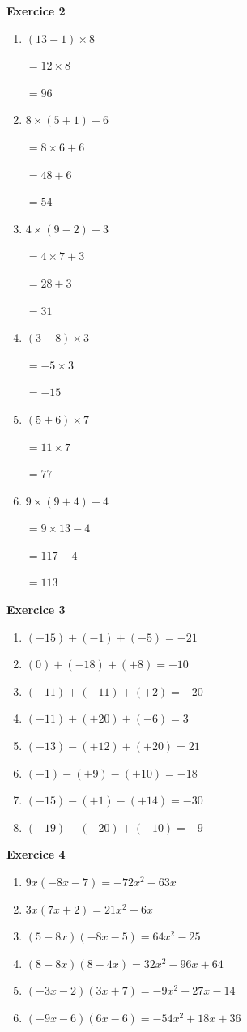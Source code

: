 \documentclass[12pt,a4paper,french]{article}
\begin{document}
\noindent\textbf{Exercice 2}\par
\smallskip
\begin{enumerate}
\item $(13 - 1) \times 8$

$= 12 \times 8$

$= 96$
\item $8 \times (5 + 1) + 6$

$= 8 \times 6 + 6$

$= 48 + 6$

$= 54$
\item $4 \times (9 - 2) + 3$

$= 4 \times 7 + 3$

$= 28 + 3$

$= 31$
\item $(3 - 8) \times 3$

$= -5 \times 3$

$= -15$
\item $(5 + 6) \times 7$

$= 11 \times 7$

$= 77$
\item $9 \times (9 + 4) - 4$

$= 9 \times 13 - 4$

$= 117 - 4$

$= 113$
\end{enumerate}
\medskip

\noindent\textbf{Exercice 3}\par
\smallskip
\begin{enumerate}
\item $(-15) + (-1) + (-5) = -21$
\item $(0) + (-18) + (+8) = -10$
\item $(-11) + (-11) + (+2) = -20$
\item $(-11) + (+20) + (-6) = 3$
\item $(+13) - (+12) + (+20) = 21$
\item $(+1) - (+9) - (+10) = -18$
\item $(-15) - (+1) - (+14) = -30$
\item $(-19) - (-20) + (-10) = -9$
\end{enumerate}
\medskip

\noindent\textbf{Exercice 4}\par
\smallskip
\begin{enumerate}
\item $9x(-8x - 7) = -72x^2 - 63x$
\item $3x(7x + 2) = 21x^2 + 6x$
\item $(5 - 8x)(-8x - 5) = 64x^2 - 25$
\item $(8 - 8x)(8 - 4x) = 32x^2 - 96x + 64$
\item $(-3x - 2)(3x + 7) = -9x^2 - 27x - 14$
\item $(-9x - 6)(6x - 6) = -54x^2 + 18x + 36$
\end{enumerate}
\medskip
\end{document}
